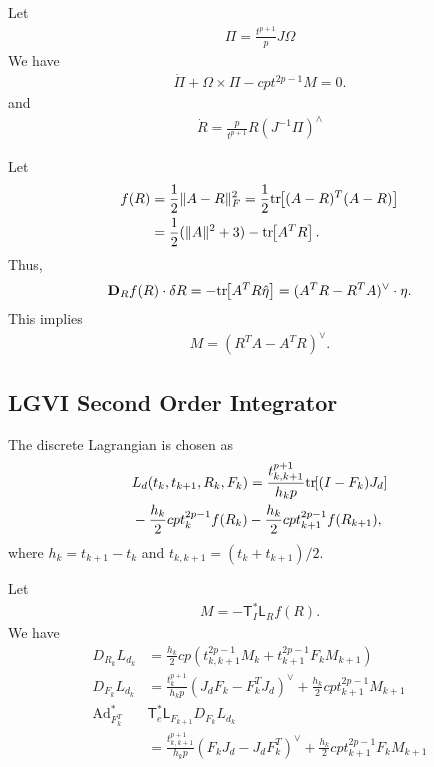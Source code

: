 \documentclass[letterpaper, 10pt, conference]{ieeeconf}
\newcommand{\bracket}[1]{\ensuremath{\left[ #1 \right]}}
\newcommand{\tr}[1]{\mbox{tr}\ensuremath{\negthickspace\bracket{#1}}}
\newcommand{\T}{\ensuremath{\mathsf{T}}}
\renewcommand{\L}{\ensuremath{\mathsf{L}}}
\newcommand{\D}{\ensuremath{\mathbf{D}}}
\newcommand{\Ad}{\ensuremath{\mathrm{Ad}}}
\begin{document}
Let
\begin{align*}
\Pi = \frac{t^{p+1}}{p} J\Omega
\end{align*}
We have
\begin{align*}
    \dot \Pi + \Omega\times \Pi - cpt^{2p-1} M = 0.
\end{align*}
and
\begin{align*}
    \dot R = \frac{p}{t^{p+1}} R (J^{-1}\Pi)^\wedge
\end{align*}


Let 
\begin{align*}
    f(R) & = \frac{1}{2}\| A- R\|^2_F = \frac{1}{2} \tr{(A-R)^T(A-R)}  \\
         & =\frac{1}{2}(\|A\|^2 + 3) - \tr{A^T R}.
\end{align*}
Thus,
\begin{align*}
    \D_R f(R) \cdot \delta R = -\tr{A^T R\hat\eta} = (A^T R- R^T A)^\vee \cdot \eta.
\end{align*}
This implies
\begin{align*}
    M = (R^T A-A^T R)^\vee.
\end{align*}

\subsection{LGVI Second Order Integrator}


The discrete Lagrangian is chosen as
\begin{align*}
    & L_d(t_k, t_{k+1}, R_k, F_k) = \frac{t_{k,k+1}^{p+1}}{h_k p} \tr{(I-F_k)J_d}\\
    &- \frac{h_k}{2}c p t_k^{2p-1} f(R_k) - \frac{h_k}{2}c p t_{k+1}^{2p-1} f(R_{k+1}),
\end{align*}
where $h_k = t_{k+1}-t_k$ and $t_{k,k+1}=(t_k + t_{k+1})/2$.

Let 
\begin{align*}
    M = -\T^*_I \L_R f(R).
\end{align*}
We have
\begin{align*}
    D_{R_k} L_{d_k} &= \frac{h_k}{2} cp (t_{k,k+1}^{2p-1} M_k + t_{k+1}^{2p-1} F_k M_{k+1})\\
    D_{F_k} L_{d_k} &= \frac{t^{p+1}_{k}}{h_k p} (J_dF_k -F_k^T J_d)^\vee + \frac{h_k}{2} cpt^{2p-1}_{k+1} M_{k+1} \\
    \Ad^*_{F_k^T} & \T^*_e \L_{F_{k+1}} D_{F_k} L_{d_k}\\
                    & = \frac{t^{p+1}_{k,k+1}}{h_k p} (F_k J_d - J_dF_k^T)^\vee + \frac{h_k}{2} cpt^{2p-1}_{k+1} F_k M_{k+1} \\
\end{align*}
\end{document}
